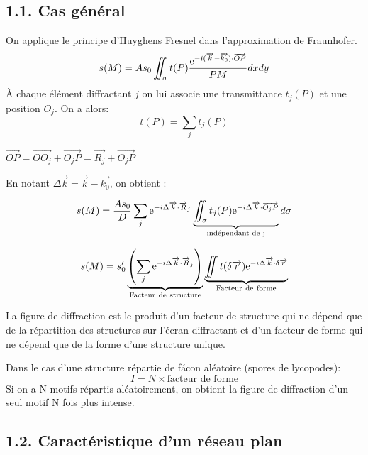 \documentclass[french, a4paper, 10pt, twocolumn, landscape]{article}
\begin{document}
\subsection*{1.1. Cas général}

On applique le principe d'Huyghens Fresnel dans l'approximation de Fraunhofer. 
\begin{equation}
    s(M) = As_0\iint_\sigma t(P)\dfrac{{\rm e}^{-i(\vec{k}-\vec{k_0})\cdot \vec{OP}}}{PM}dxdy
\end{equation}
À chaque élément diffractant $j$ on lui associe une transmittance  $t_j(P)$ et une position $O_j$. On a alors:
\begin{equation}
    t(P)=\sum_jt_j(P)
\end{equation}

$\vec{OP}=\vec{OO_j}+{\vec{O_jP}}=\vec{R_j}+\vec{O_jP}$

En notant $\Delta \vec{k} = \vec{k}-\vec{k_0}$, on obtient : 

\begin{equation}
    s(M) = \dfrac{As_0}{D}\sum_j{\rm e}^{-i\Delta\vec{k}\cdot \vec{R}_j}\underbrace{\iint_\sigma t_j(P){\rm e}^{-i\Delta \vec{k}\cdot \vec{O_jP}}}_{\text{indépendant de j}}d\sigma
\end{equation}

\begin{equation}
    s(M) = s_0^\prime\underbrace{\left(\sum_j{\rm e}^{-i\Delta\vec{k}\cdot\vec{R}_j}\right)}_{\rm Facteur~de~structure}\underbrace{\iint t(\delta\vec{r}){\rm e}^{-i\Delta \vec{k}\cdot\delta\vec{r}}}_{\rm Facteur~de~forme}
\end{equation}

La figure de diffraction est le produit d'un facteur de structure qui ne dépend que de la répartition des structures sur l'écran diffractant et d'un facteur de forme qui ne dépend que de la forme d'une structure unique.

Dans le cas d'une structure répartie de fácon aléatoire (spores de lycopodes): 
$$I = N\times \text{facteur de forme}$$ Si on a N motifs répartis aléatoirement, on obtient la figure de diffraction d'un seul motif N fois plus intense.

\subsection*{1.2. Caractéristique d'un réseau plan}
\end{document}
